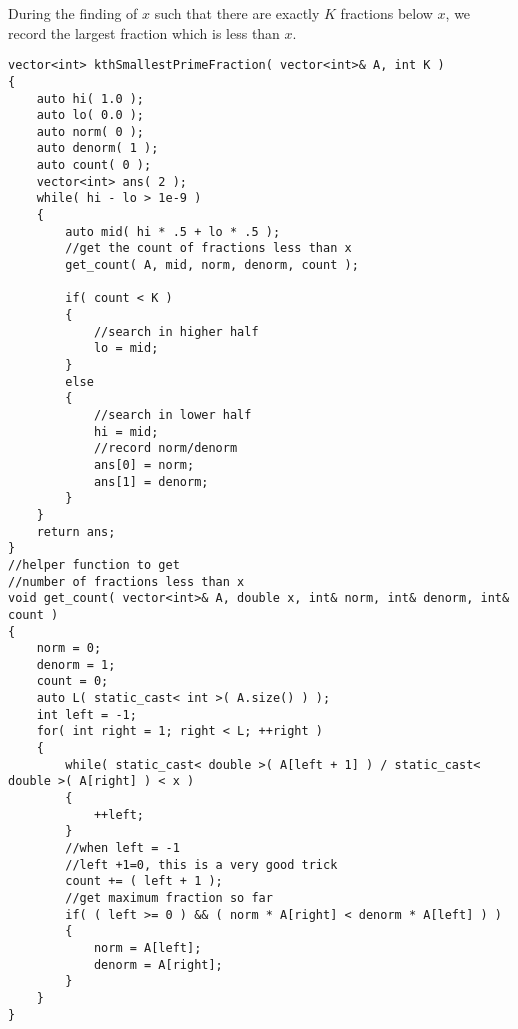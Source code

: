 During the finding of $x$ such that there are exactly $K$ fractions below $x$, we record the largest fraction which is less than $x$.

\setcounter{lstlisting}{0}
\begin{lstlisting}[style=customc, caption={Binary Search}]
vector<int> kthSmallestPrimeFraction( vector<int>& A, int K )
{
    auto hi( 1.0 );
    auto lo( 0.0 );
    auto norm( 0 );
    auto denorm( 1 );
    auto count( 0 );
    vector<int> ans( 2 );
    while( hi - lo > 1e-9 )
    {
        auto mid( hi * .5 + lo * .5 );
        //get the count of fractions less than x
        get_count( A, mid, norm, denorm, count );

        if( count < K )
        {
            //search in higher half
            lo = mid;
        }
        else
        {
            //search in lower half
            hi = mid;
            //record norm/denorm
            ans[0] = norm;
            ans[1] = denorm;
        }
    }
    return ans;
}
//helper function to get
//number of fractions less than x
void get_count( vector<int>& A, double x, int& norm, int& denorm, int& count )
{
    norm = 0;
    denorm = 1;
    count = 0;
    auto L( static_cast< int >( A.size() ) );
    int left = -1;
    for( int right = 1; right < L; ++right )
    {
        while( static_cast< double >( A[left + 1] ) / static_cast< double >( A[right] ) < x )
        {
            ++left;
        }
        //when left = -1
        //left +1=0, this is a very good trick
        count += ( left + 1 );
        //get maximum fraction so far
        if( ( left >= 0 ) && ( norm * A[right] < denorm * A[left] ) )
        {
            norm = A[left];
            denorm = A[right];
        }
    }
}
\end{lstlisting}